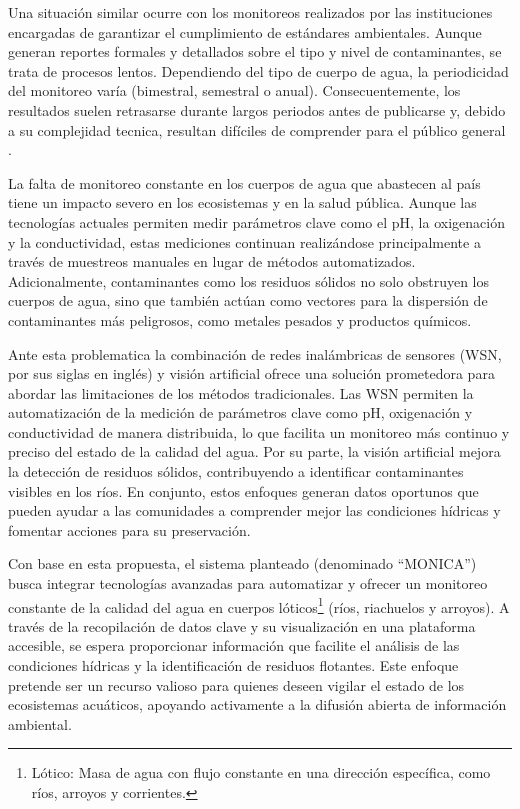 Una situación similar ocurre con los monitoreos realizados por las instituciones encargadas de garantizar el cumplimiento de estándares ambientales. Aunque generan reportes formales y detallados sobre el tipo y nivel de contaminantes, se trata de procesos lentos. Dependiendo del tipo de cuerpo de agua, la periodicidad del monitoreo varía (bimestral, semestral o anual). Consecuentemente, los resultados suelen retrasarse durante largos periodos antes de publicarse y, debido a su complejidad tecnica, resultan difíciles de comprender para el público general \cite{guiaMonitoreo2024}.

La falta de monitoreo constante en los cuerpos de agua que abastecen al país tiene un impacto severo en los ecosistemas y en la salud pública. Aunque las tecnologías actuales permiten medir parámetros clave como el pH, la oxigenación y la conductividad, estas mediciones continuan realizándose principalmente a través de muestreos manuales en lugar de métodos automatizados. Adicionalmente, contaminantes como los residuos sólidos no solo obstruyen los cuerpos de agua, sino que también actúan como vectores para la dispersión de contaminantes más peligrosos, como metales pesados y productos químicos.

Ante esta problematica la combinación de redes inalámbricas de sensores (WSN, por sus siglas en inglés) y visión artificial ofrece una solución prometedora para abordar las limitaciones de los métodos tradicionales. Las WSN permiten la automatización de la medición de parámetros clave como pH, oxigenación y conductividad de manera distribuida, lo que facilita un monitoreo más continuo y preciso del estado de la calidad del agua. Por su parte, la visión artificial mejora la detección de residuos sólidos, contribuyendo a identificar contaminantes visibles en los ríos. En conjunto, estos enfoques generan datos oportunos que pueden ayudar a las comunidades a comprender mejor las condiciones hídricas y fomentar acciones para su preservación.

Con base en esta propuesta, el sistema planteado (denominado ``MONICA'') busca integrar tecnologías avanzadas para automatizar y ofrecer un monitoreo constante de la calidad del agua en cuerpos lóticos\footnote{Lótico: Masa de agua con flujo constante en una dirección específica, como ríos, arroyos y corrientes\cite{conagua2024}.} (ríos, riachuelos y arroyos). A través de la recopilación de datos clave y su visualización en una plataforma accesible, se espera proporcionar información que facilite el análisis de las condiciones hídricas y la identificación de residuos flotantes. Este enfoque pretende ser un recurso valioso para quienes deseen vigilar el estado de los ecosistemas acuáticos, apoyando activamente a la difusión abierta de información ambiental.
